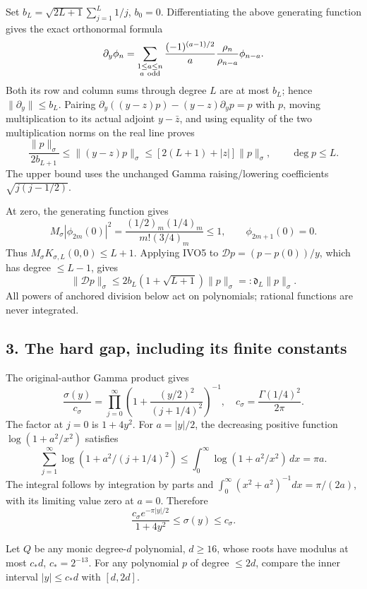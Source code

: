 Set \(b_L=\sqrt{2L+1}\sum_{j=1}^L1/j\), \(b_0=0\). Differentiating the above generating function gives the exact orthonormal formula \[
\partial_y\phi_n=\sum_{\substack{1\le a\le n\\a\ {\rm odd}}}
\frac{(-1)^{(a-1)/2}}a\frac{\rho_n}{\rho_{n-a}}\phi_{n-a}.
\] Both its row and column sums through degree \(L\) are at most \(b_L\); hence \(\|\partial_y\|\le b_L\). Pairing \(\partial_y((y-z)p)-(y-z)\partial_yp=p\) with \(p\), moving multiplication to its actual adjoint \(y-\bar z\), and using equality of the two multiplication norms on the real line proves \[
\frac{\|p\|_\sigma}{2b_{L+1}}\le\|(y-z)p\|_\sigma
\le[2(L+1)+|z|]\|p\|_\sigma,\qquad \deg p\le L.
\tag{IVO5}
\] The upper bound uses the unchanged Gamma raising/lowering coefficients \(\sqrt{j(j-1/2)}\).

At zero, the generating function gives \[
M_\sigma|\phi_{2m}(0)|^2
=\frac{(1/2)_m(1/4)_m}{m!(3/4)_m}\le1,\qquad \phi_{2m+1}(0)=0.
\] Thus \(M_\sigma K_{\sigma,L}(0,0)\le L+1\). Applying IVO5 to \({\mathscr D}p=(p-p(0))/y\), which has degree \(\le L-1\), gives \[
\|{\mathscr D}p\|_\sigma
\le2b_L(1+\sqrt{L+1})\|p\|_\sigma=:\mathfrak d_L\|p\|_\sigma.
\tag{IVO6}
\] All powers of anchored division below act on polynomials; rational functions are never integrated.

\subsection{3. The hard gap, including its finite constants}\label{the-hard-gap-including-its-finite-constants}

The original-author Gamma product gives \[
\frac{\sigma(y)}{c_\sigma}
=\prod_{j=0}^\infty\left(1+\frac{(y/2)^2}{(j+1/4)^2}\right)^{-1},
\quad c_\sigma=\frac{\Gamma(1/4)^2}{2\pi}.
\] The factor at \(j=0\) is \(1+4y^2\). For \(a=|y|/2\), the decreasing positive function \(\log(1+a^2/x^2)\) satisfies \[
\sum_{j=1}^\infty\log(1+a^2/(j+1/4)^2)
\le\int_0^\infty\log(1+a^2/x^2)\,dx=\pi a.
\] The integral follows by integration by parts and \(\int_0^\infty (x^2+a^2)^{-1}dx=\pi/(2a)\), with its limiting value zero at \(a=0\). Therefore \[
\frac{c_\sigma e^{-\pi|y|/2}}{1+4y^2}\le\sigma(y)\le c_\sigma.
\tag{IVO7}
\]

Let \(Q\) be any monic degree-\(d\) polynomial, \(d\ge16\), whose roots have modulus at most \(c_*d\), \(c_*=2^{-13}\). For any polynomial \(p\) of degree \(\le2d\), compare the inner interval \(|y|\le c_*d\) with \([d,2d]\).

